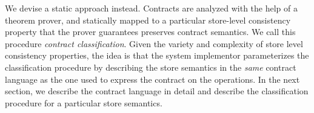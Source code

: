 We devise a static approach instead. Contracts are analyzed with the help of a
theorem prover, and statically mapped to a particular store-level consistency
property that the prover guarantees preserves contract semantics. We call this
procedure \emph{contract classification}. Given the variety and complexity of
store level consistency properties, the idea is that the system implementor
parameterizes the classification procedure by describing the store semantics in
the \emph{same} contract language as the one used to express the contract on
the operations. In the next section, we describe the contract language in
detail and describe the classification procedure for a particular store
semantics.
